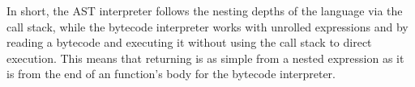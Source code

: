 \documentclass[notitlepage]{report}
\begin{document}
\begin{enumerate}
		In short, the AST interpreter follows the nesting depths of the language via the call stack, while the bytecode interpreter works with unrolled expressions and by reading a bytecode and executing it without using the call stack to direct execution.  This means that returning is as simple from a nested expression as it is from the end of an function's body for the bytecode interpreter.
\end{enumerate}
\end{document}
